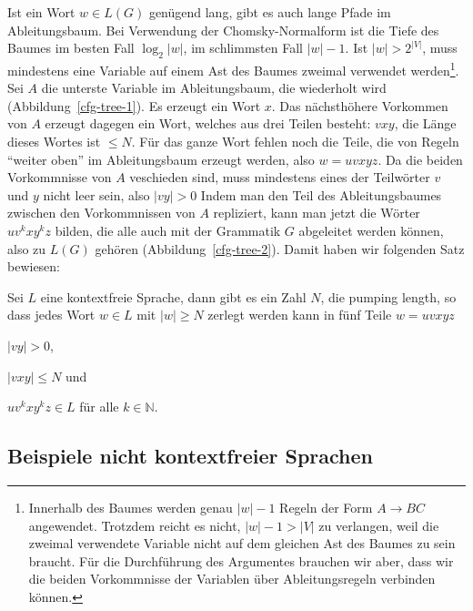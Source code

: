 Ist ein Wort $w\in L(G)$ genügend lang, gibt es auch lange Pfade im
Ableitungsbaum.
Bei Verwendung der Chomsky-Normalform ist die 
Tiefe des Baumes im besten Fall $\log_2 |w|$, im schlimmsten Fall $|w|-1$.
Ist $|w|>2^{|V|}$, muss mindestens eine
Variable auf einem Ast des Baumes zweimal verwendet werden\footnote{
Innerhalb des Baumes werden genau $|w|-1$ Regeln der
Form $A\to BC$ angewendet.
Trotzdem reicht es nicht, $|w|-1>|V|$ zu verlangen, weil die
zweimal verwendete Variable nicht auf dem gleichen Ast des
Baumes zu sein braucht.
Für die Durchführung des Argumentes
brauchen wir aber, dass wir die beiden Vorkommnisse der Variablen
über Ableitungsregeln verbinden können.}.
Sei $A$ die unterste Variable im Ableitungsbaum, die wiederholt
wird (Abbildung~\ref{cfg-tree-1}).
Es erzeugt ein Wort $x$.
Das nächsthöhere Vorkommen von $A$
erzeugt dagegen ein Wort, welches aus drei Teilen besteht:
$vxy$, die Länge dieses Wortes ist $\le N$.
Für das ganze Wort fehlen
noch die Teile, die von Regeln ``weiter oben'' im Ableitungsbaum
erzeugt werden, also $w=uvxyz$.
Da die beiden Vorkommnisse von $A$ veschieden sind, muss mindestens
eines der Teilwörter $v$ und $y$ nicht leer sein, also $|vy|>0$
Indem man den Teil des Ableitungsbaumes
zwischen den Vorkommnissen von $A$ repliziert, kann man jetzt die
Wörter $uv^kxy^kz$ bilden, die alle auch mit der Grammatik $G$ 
abgeleitet werden können, also zu $L(G)$ gehören (Abbildung~\ref{cfg-tree-2}).
Damit haben wir folgenden Satz bewiesen:

\begin{satz}
%
%
Sei $L$ eine kontextfreie Sprache, dann gibt es ein Zahl $N$, die pumping
length, so dass jedes Wort $w\in L$ mit $|w|\ge N$ zerlegt werden
kann in fünf Teile $w=uvxyz$
\begin{compactenum}
\item
$|vy|>0$,
\item
$|vxy|\le N$ und
\item
$uv^kxy^kz\in L$ für alle $k\in\mathbb N$.
\end{compactenum}
\end{satz}

\subsection{Beispiele nicht kontextfreier Sprachen}
